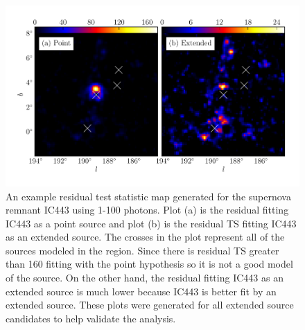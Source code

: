 \documentclass[12pt,preprint]{aastex}
\newcommand{\gev}{\text{GeV}\xspace}
\newcommand{\ts}{\text{TS}\xspace}
\begin{document}
\begin{figure}
  \begin{center}
  \includegraphics{ic443_plots/res_tsmap_ic443.pdf}

  \caption{An example residual test statistic map generated for the
  supernova remnant IC443 using 1-100 \gev photons. 
  Plot (a) is the residual \ts fitting IC443 as a point
  source and plot (b) is the residual TS fitting IC443 as an extended
  source. The crosses in the plot represent all of the sources modeled
  in the region. Since there is residual TS greater than 160 fitting
  with the point hypothesis so it is not a good model of the source.
  On the other hand, the residual fitting IC443 as an extended source
  is much lower because IC443 is better fit by an extended source. These
  plots were generated for all extended source candidates to help validate
  the analysis.}
  \label{res_tsmaps}
  \end{center}
\end{figure}
\end{document}
